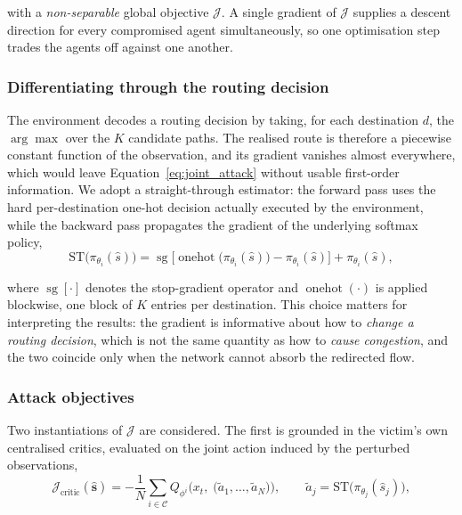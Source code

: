 \noindent with a \emph{non-separable} global objective $\mathcal{J}$. A single
gradient of $\mathcal{J}$ supplies a descent direction for every compromised agent
simultaneously, so one optimisation step trades the agents off against one another.

\subsubsection*{Differentiating through the routing decision}

The environment decodes a routing decision by taking, for each destination $d$, the
$\arg\max$ over the $K$ candidate paths. The realised route is therefore a piecewise
constant function of the observation, and its gradient vanishes almost everywhere,
which would leave Equation~\eqref{eq:joint_attack} without usable first-order
information. We adopt a straight-through estimator: the forward pass uses the hard
per-destination one-hot decision actually executed by the environment, while the
backward pass propagates the gradient of the underlying softmax policy,
\begin{equation}
  \mathrm{ST}\big(\pi_{\theta_i}(\hat{s})\big)
  = \operatorname{sg}\!\Big[
      \operatorname{onehot}\big(\pi_{\theta_i}(\hat{s})\big) - \pi_{\theta_i}(\hat{s})
    \Big] + \pi_{\theta_i}(\hat{s}),
  \label{eq:straight_through}
\end{equation}

\noindent where $\operatorname{sg}[\cdot]$ denotes the stop-gradient operator and
$\operatorname{onehot}(\cdot)$ is applied blockwise, one block of $K$ entries per
destination. This choice matters for interpreting the results: the gradient is
informative about how to \emph{change a routing decision}, which is not the same
quantity as how to \emph{cause congestion}, and the two coincide only when the
network cannot absorb the redirected flow.

\subsubsection*{Attack objectives}

Two instantiations of $\mathcal{J}$ are considered. The first is grounded in the
victim's own centralised critics, evaluated on the joint action induced by the
perturbed observations,
\begin{equation}
  \mathcal{J}_{\text{critic}}(\hat{\mathbf{s}})
  = -\frac{1}{N} \sum_{i \in \mathcal{C}}
    Q_{\phi^i}\Big( x_t, \; \big(\tilde{a}_1, \dots, \tilde{a}_N \big) \Big),
  \qquad
  \tilde{a}_j = \mathrm{ST}\big(\pi_{\theta_j}(\hat{s}_j)\big),
  \label{eq:obj_critic}
\end{equation}

